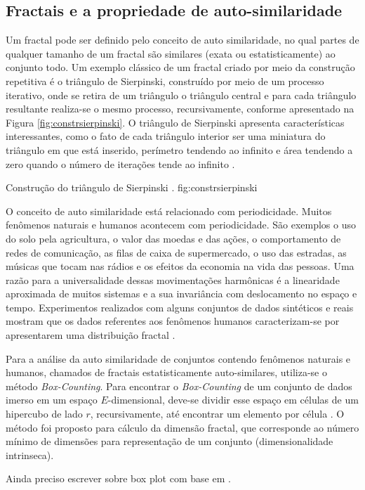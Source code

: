 \subsection{Fractais e a propriedade de auto-similaridade}
	\label{subsec:fractais}

Um fractal pode ser definido pelo conceito de auto similaridade, no qual partes
de qualquer tamanho de um fractal são similares (exata ou estatisticamente) ao
conjunto todo. Um exemplo clássico de um fractal criado por meio da construção
repetitiva é o triângulo de Sierpinski, construído por meio de um processo
iterativo, onde se retira de um triângulo o triângulo central e para cada
triângulo resultante realiza-se o mesmo processo, recursivamente, conforme
apresentado na Figura \ref{fig:constrsierpinski}. O triângulo de Sierpinski
apresenta características interessantes, como o fato de cada triângulo interior
ser uma miniatura do triângulo em que está inserido, perímetro tendendo ao
infinito e área tendendo a zero quando o número de iterações tende ao infinito
\cite{Schroeder91}. 

{Construção do triângulo de Sierpinski \cite{Schroeder91}.}
{fig:constrsierpinski}

O conceito de auto similaridade está relacionado com periodicidade. Muitos
fenômenos naturais e humanos acontecem com periodicidade. São exemplos o uso do
solo pela agricultura, o valor das moedas e das ações, o comportamento de redes
de comunicação, as filas de caixa de supermercado, o uso das estradas, as
músicas que tocam nas rádios e os efeitos da economia na vida das pessoas. Uma
razão para a universalidade dessas movimentações harmônicas é a linearidade
aproximada de muitos sistemas e a sua invariância com deslocamento no espaço e
tempo. Experimentos realizados com alguns conjuntos de dados sintéticos e reais
mostram que os dados referentes aos fenômenos humanos caracterizam-se por
apresentarem uma distribuição fractal \cite{Traina2010}.

Para a análise da auto similaridade de conjuntos contendo fenômenos naturais e
humanos, chamados de fractais estatisticamente auto-similares, utiliza-se o
método \textit{Box-Counting}. Para encontrar o \textit{Box-Counting} de um
conjunto de dados imerso em um espaço $E$-dimensional, deve-se dividir esse
espaço em células de um hipercubo de lado $r$, recursivamente, até encontrar um
elemento por célula \cite{Traina2010}. O método foi proposto para cálculo da
dimensão fractal, que corresponde ao número mínimo de dimensões para
representação de um conjunto (dimensionalidade intrinseca). 

Ainda preciso escrever sobre box plot com base em \cite{Traina2010}.
